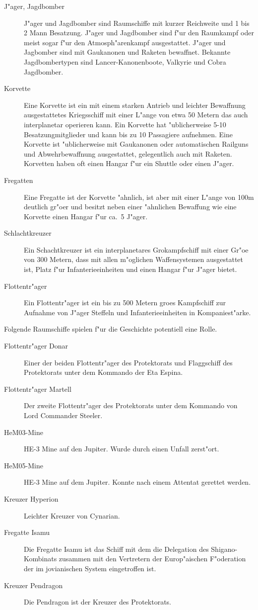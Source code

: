 \begin{description}
\item [J"ager, Jagdbomber] J"ager und Jagdbomber sind Raumschiffe mit kurzer Reichweite und 1 bis 2 Mann Besatzung.
      J"ager und Jagdbomber sind f"ur den Raumkampf oder meist sogar f"ur den Atmosph"arenkampf ausgestattet. J"ager und Jagbomber sind mit Gau\3kanonen und Raketen bewaffnet. Bekannte Jagdbombertypen sind Lancer-Kanonenboote, Valkyrie  und Cobra Jagdbomber.
\item [Korvette] Eine Korvette ist ein mit einem starken Antrieb und leichter Bewaffnung ausgestattetes Kriegsschiff
      mit einer L"ange von etwa 50 Metern das auch interplanetar operieren kann. Ein Korvette hat "ublicherweise 5-10 Besatzungmitglieder und kann bis zu 10 Passagiere aufnehmen. Eine Korvette ist "ublicherweise mit Gau\3kanonen oder automatischen Railguns und Abwehrbewaffnung ausgestattet, gelegentlich auch mit Raketen. Korvetten haben oft einen Hangar f"ur ein Shuttle oder einen J"ager.
\item [Fregatten] Eine Fregatte ist der Korvette "ahnlich, ist aber mit einer L"ange von 100m deutlich gr"o\3er und besitzt
      neben einer "ahnlichen Bewaffung wie eine Korvette einen Hangar f"ur ca.~5 J"ager.
\item [Schlachtkreuzer] Ein Schachtkreuzer ist ein interplanetares Gro\3kampfschiff mit einer Gr"o\3e von 300 Metern,
      dass mit allen m"oglichen Waffensystemen ausgestattet ist, Platz f"ur Infanterieeinheiten und einen Hangar f"ur J"ager bietet.
\item [Flottentr"ager] Ein Flottentr"ager ist ein bis zu 500 Metern gro\3es Kampfschiff zur Aufnahme von
      J"ager Steffeln und Infanterieeinheiten in Kompaniest"arke.
\end{description}

Folgende Raumschiffe spielen f"ur die Geschichte potentiell eine Rolle.

\begin{description}
\item [Flottentr"ager Donar] Einer der beiden Flottentr"ager des Protektorats und Flaggschiff des Protektorats unter
       dem Kommando der Eta Espina.
\item [Flottentr"ager Martell] Der zweite Flottentr"ager des Protektorats unter dem Kommando von Lord Commander Steeler.
\item [HeM03-Mine] HE-3 Mine auf den Jupiter. Wurde durch einen Unfall zerst"ort.
\item [HeM05-Mine] HE-3 Mine auf dem Jupiter. Konnte nach einem Attentat gerettet werden.
\item [Kreuzer Hyperion] Leichter Kreuzer von Cynarian.
\item [Fregatte Isamu] Die Fregatte Isamu ist das Schiff mit dem die Delegation des Shigano-Kombinats zusammen mit den 
      Vertretern der Europ"aischen F"oderation der im jovianischen System eingetroffen ist.
\item [Kreuzer Pendragon] Die Pendragon ist der Kreuzer des Protektorats.
\end{description}

